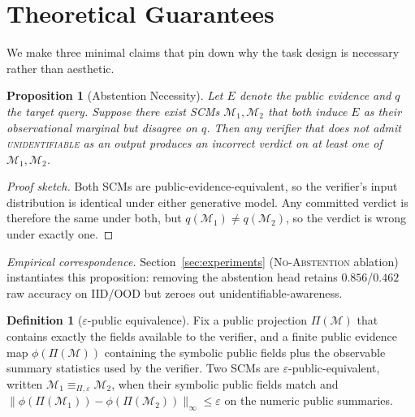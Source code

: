 \documentclass{article}
\theoremstyle{plain}
\newtheorem{proposition}[theorem]{Proposition}
\theoremstyle{definition}
\newtheorem{definition}[theorem]{Definition}
\theoremstyle{remark}
\begin{document}
\section{Theoretical Guarantees}
\label{sec:theory}

We make three minimal claims that pin down why the task design is necessary
rather than aesthetic.

\begin{proposition}[Abstention Necessity]
\label{prop:abstention}
Let $E$ denote the public evidence and $q$ the target query. Suppose there
exist SCMs $\mathcal{M}_1, \mathcal{M}_2$ that both induce $E$ as their
observational marginal but disagree on $q$. Then any verifier that does not
admit {\normalfont\textsc{unidentifiable}} as an output produces an incorrect
verdict on
at least one of $\mathcal{M}_1, \mathcal{M}_2$.
\end{proposition}
\begin{proof}[Proof sketch]
Both SCMs are public-evidence-equivalent, so the verifier's input distribution
is identical under either generative model. Any committed verdict is therefore
the same under both, but $q(\mathcal{M}_1) \neq q(\mathcal{M}_2)$, so the
verdict is wrong under exactly one.
\end{proof}

\emph{Empirical correspondence.} Section~\ref{sec:experiments}
(\textsc{No-Abstention} ablation) instantiates this proposition: removing the
abstention head retains $0.856$/$0.462$ raw accuracy on IID/OOD but zeroes out
unidentifiable-awareness.

\begin{definition}[$\varepsilon$-public equivalence]
\label{def:public-equivalence}
Fix a public projection $\Pi(\mathcal{M})$ that contains exactly the fields
available to the verifier, and a finite public evidence map
$\phi(\Pi(\mathcal{M}))$ containing the symbolic public fields plus the
observable summary statistics used by the verifier. Two SCMs are
$\varepsilon$-public-equivalent, written
$\mathcal{M}_1 \equiv_{\Pi,\varepsilon} \mathcal{M}_2$, when their symbolic
public fields match and
$\|\phi(\Pi(\mathcal{M}_1))-\phi(\Pi(\mathcal{M}_2))\|_\infty \le
\varepsilon$ on the numeric public summaries.
\end{definition}
\end{document}
